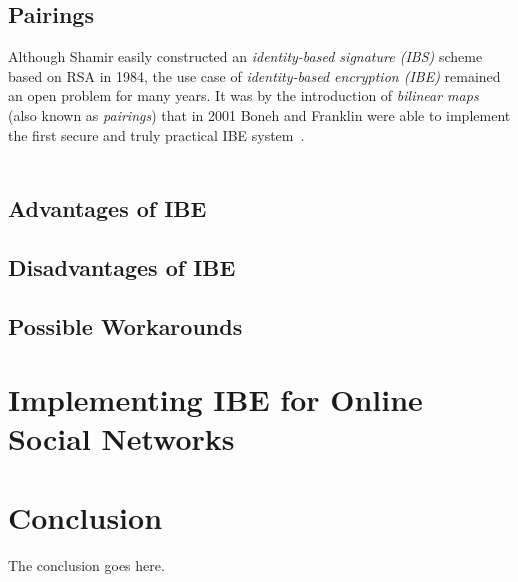 \documentclass[journal]{IEEEtran}
\begin{document}
\subsection{Pairings}
Although Shamir easily constructed an \textit{identity-based signature (IBS)}
scheme based on RSA in 1984, the use case of \textit{identity-based encryption
(IBE)} remained an open problem for many years. It was by the introduction of
\textit{bilinear maps} (also known as \textit{pairings}) that in 2001 Boneh and
Franklin\cite{BonehFranklinIBE} were able to implement the first secure and
truly practical IBE system~\cite{Baek04asurvey}.\\
\\


\subsection{Advantages of IBE}

\subsection{Disadvantages of IBE}

\subsection{Possible Workarounds}\label{sec:possible-workarounds}

\section{Implementing IBE for Online Social Networks}



\section{Conclusion}
The conclusion goes here.

%
\end{document}
